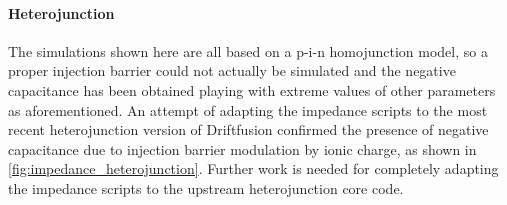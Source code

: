 \begin{figure}
\end{figure}


\paragraph{Heterojunction}
The simulations shown here are all based on a p-i-n homojunction model, so a proper injection barrier could not actually be simulated and the negative capacitance has been obtained playing with extreme values of other parameters as aforementioned.
An attempt of adapting the impedance scripts to the most recent heterojunction version of Driftfusion confirmed the presence of negative capacitance due to injection barrier modulation by ionic charge, as shown in \cref{fig:impedance_heterojunction}.
Further work is needed for completely adapting the impedance scripts to the upstream heterojunction core code.

